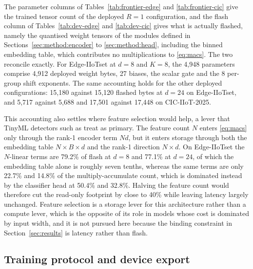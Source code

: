 \documentclass[10pt,letterpaper,twocolumn]{article}
\begin{document}
The parameter columns of Tables~\ref{tab:frontier-edge} and
\ref{tab:frontier-cic} give the trained tensor count of the deployed $R = 1$
configuration, and the flash column of Tables~\ref{tab:dev-edge} and
\ref{tab:dev-cic} gives what is actually flashed, namely the quantised weight
tensors of the modules defined in Sections~\ref{sec:method:encoder} to
\ref{sec:method:head}, including the binned embedding table, which contributes
no multiplications to \eqref{eq:macs}. The two reconcile exactly. For
Edge-IIoTset at $d = 8$ and $K = 8$, the 4,948 parameters comprise 4,912
deployed weight bytes, 27 biases, the scalar gate and the 8 per-group shift
exponents. The same accounting holds for the other deployed configurations:
15,180 against 15,120 flashed bytes at $d = 24$ on Edge-IIoTset, and 5,717
against 5,688 and 17,501 against 17,448 on CIC-IIoT-2025.

This accounting also settles where feature selection would help, a lever that
TinyML detectors such as \cite{hamdouchi2025tinyml} treat as primary. The
feature count $N$ enters \eqref{eq:macs} only through the rank-1 encoder term
$N d$, but it enters storage through both the embedding table $N \times B
\times d$ and the rank-1 direction $N \times d$. On Edge-IIoTset the
$N$-linear terms are 79.2\% of flash at $d = 8$ and 77.1\% at $d = 24$, of
which the embedding table alone is roughly seven tenths, whereas the same
terms are only 22.7\% and 14.8\% of the multiply-accumulate count, which is
dominated instead by the classifier head at 50.4\% and 32.8\%. Halving the
feature count would therefore cut the read-only footprint by close to
40\% while leaving latency largely unchanged. Feature selection is a storage
lever for this architecture rather than a compute lever, which is the opposite
of its role in models whose cost is dominated by input width, and it is not
pursued here because the binding constraint in
Section~\ref{sec:results} is latency rather than flash.

\subsection{Training protocol and device export}
\label{sec:method:training}
\end{document}
